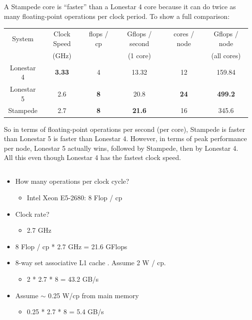 \documentclass{article}
\begin{document}
\clearpage


\subsection{}
A Stampede core is ``faster'' than a Lonestar 4 core because it can do twice as many floating-point operations
per clock period. To show a full comparison:
\begin{table}[ht]
\begin{center}
\begin{tabular}{cccccc}
System & Clock Speed& flops / cp & Gflops / second & cores / node & Gflops / node\\
             & (GHz)          &                 &             (1 core)     &                     & (all cores)\\
\hline
Lonestar 4 &\textbf{3.33} & 4 & 13.32 & 12 & 159.84\\
Lonestar 5 & 2.6 & \textbf{8} & 20.8 & \textbf{24} & \textbf{499.2}\\
Stampede & 2.7 & \textbf{8} & \textbf{21.6} & 16 & 345.6
\end{tabular}
\end{center}
\end{table}

So in terms of floating-point operations per second (per core), Stampede is faster than Lonestar 5 is faster than Lonestar 4. However, in terms of peak performance per node, Lonestar 5 actually wins, followed by Stampede, then by Lonestar 4.
All this even though Lonestar 4 has the fastest clock speed.


\subsection{}
\begin{itemize}
\item How many operations per clock cycle?
\begin{itemize}
	\item Intel Xeon E5-2680: 8 Flop / cp
\end{itemize}
\item Clock rate?
\begin{itemize}
	\item 2.7 GHz
\end{itemize}
\item 8 Flop / cp * 2.7 GHz = 21.6 GFlops
\item 8-way set associative L1 cache \cite{2680}. Assume 2 W / cp.
\begin{itemize}
	\item 2 * 2.7 * 8 = 43.2 GB/s
\end{itemize}
\item Assume $\sim$ 0.25 W/cp from main memory
\begin{itemize}
	\item 0.25 * 2.7 * 8 = 5.4 GB/s
\end{itemize}
\end{itemize}
\end{document}
